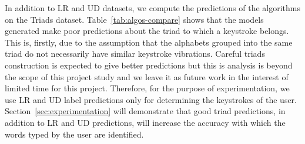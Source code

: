 \documentclass[11pt,conference]{IEEEtran}
\begin{document}
In addition to LR and UD datasets, we compute the predictions of the algorithms on the Triads dataset. Table~\ref{tab:algos-compare} shows that the models generated make poor predictions about the triad to which a keystroke belongs. This is, firstly, due to the assumption that the alphabets grouped into the same triad do not necessarily have similar keystroke vibrations. Careful triads construction is expected to give better predictions but this is analysis is beyond the scope of this project study and we leave it as future work in the interest of limited time for this project. Therefore, for the purpose of experimentation, we use LR and UD label predictions only for determining the keystrokes of the user. Section~\ref{sec:experimentation} will demonstrate that good triad predictions, in addition to LR and UD predictions, will increase the accuracy with which the words typed by the user are identified. 

\begin{table}[h]
\centering
{%
{}
}
\caption{Test accuracies on $1/3^{rd}$ of dataset}
\label{tab:algos-compare}
\end{table}

\begin{table}[h]
\centering
{%
{}
}
\caption{Test accuracies with and without FFT features using AdaBoost with RandomForests.}
\label{tab:ffts-non-ffts}
\end{table}
\end{document}
